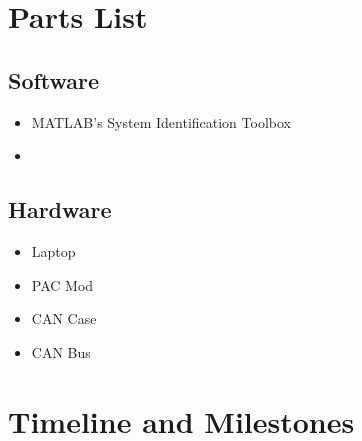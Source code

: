 \documentclass[letterpaper,12pt]{article}   %
\begin{document}



\section{Parts List}
	\subsection{Software}
	\begin{itemize}
    \item MATLAB's System Identification Toolbox 
    \item  
 \end{itemize} 
	
	\subsection{Hardware} 
	\begin{itemize}
    \item Laptop
    \item PAC Mod 
    \item CAN Case 
    \item CAN Bus 
 \end{itemize}

\section{Timeline and Milestones} \label{sec:timeline}
\end{document}
